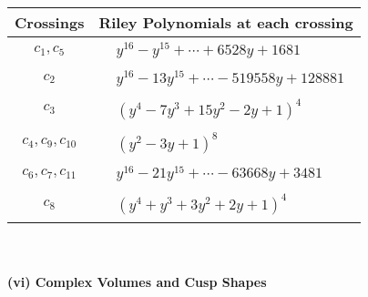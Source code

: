 \documentclass[1p]{elsarticle_modified}
\theoremstyle{definition}
\begin{document}
\begin{tabular}{m{50pt}|m{274pt}}
Crossings & \hspace{64pt}Riley Polynomials at each crossing \\
\hline $$\begin{aligned}c_{1},c_{5}\end{aligned}$$&$\begin{aligned}
&y^{16}- y^{15}+\cdots+6528 y+1681
\end{aligned}$\\
\hline $$\begin{aligned}c_{2}\end{aligned}$$&$\begin{aligned}
&y^{16}-13 y^{15}+\cdots-519558 y+128881
\end{aligned}$\\
\hline $$\begin{aligned}c_{3}\end{aligned}$$&$\begin{aligned}
&(y^4-7 y^3+15 y^2-2 y+1)^4
\end{aligned}$\\
\hline $$\begin{aligned}c_{4},c_{9},c_{10}\end{aligned}$$&$\begin{aligned}
&(y^2-3 y+1)^8
\end{aligned}$\\
\hline $$\begin{aligned}c_{6},c_{7},c_{11}\end{aligned}$$&$\begin{aligned}
&y^{16}-21 y^{15}+\cdots-63668 y+3481
\end{aligned}$\\
\hline $$\begin{aligned}c_{8}\end{aligned}$$&$\begin{aligned}
&(y^4+y^3+3 y^2+2 y+1)^4
\end{aligned}$\\
\hline
\end{tabular}\\~\\
\newpage\flushleft \textbf{(vi) Complex Volumes and Cusp Shapes}
\end{document}
